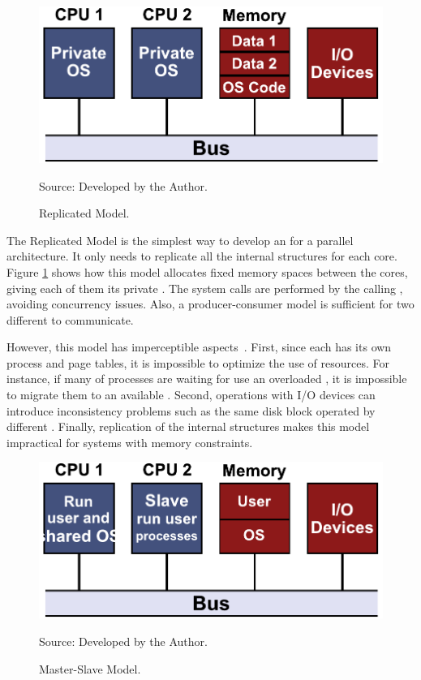 			\begin{figure}[h]
				\centering
				\caption{Replicated \os Model.}

				\includegraphics[width=.7\textwidth]{images/replicated-os.pdf}

				Source: Developed by the Author.

				\label{fig.replicated-os}
			\end{figure}

			The Replicated Model is the simplest way to develop an \os for a
			parallel architecture.
			It only needs to replicate all the internal \os structures for each core.
			Figure \ref{fig.replicated-os} shows how this model allocates fixed memory spaces
			between the cores, giving each of them its private \os.
			The system calls are performed by the calling \cpu, avoiding concurrency issues.
			Also, a producer-consumer model is sufficient for two different \cpus to communicate.

			However, this model has imperceptible aspects~\cite{tanenbaum:4ed}.
			First, since each \cpu has its own process and page tables, it is impossible
			to optimize the use of resources.
			For instance, if many of processes are waiting for use an overloaded \cpu,
			it is impossible to migrate them to an available \cpu.
			Second, operations with I/O devices can introduce inconsistency problems
			such as the same disk block operated by different \cpus.
			Finally, replication of the internal \os structures makes this model
			impractical for systems with memory constraints.

			\begin{figure}[h]
				\centering
				\caption{Master-Slave \os Model.}

				\includegraphics[width=.7\textwidth]{images/master-slave-os.pdf}

				Source: Developed by the Author.

				\label{fig.master-slave-os}
			\end{figure}


